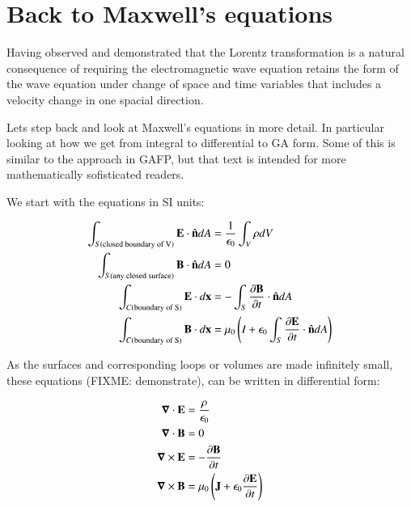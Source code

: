 \documentclass{article}      %
\title{} %
\author{Peeter Joot}         %
\date{ July 12, 2008. Revised $Date: 2008/09/05 00:44:36 $}
\newcommand{\spacegrad}[0]{\boldsymbol{\nabla}}
\begin{document}


\maketitle{}

\section{ Back to Maxwell's equations }

Having observed and demonstrated that the Lorentz transformation is a natural consequence of requiring the electromagnetic wave equation retains the
form of the wave equation under change of space and time variables that includes a velocity change in one spacial direction.

Lets step back and look at Maxwell's equations in more detail.  In particular looking at how we get from integral to differential
to GA form.  Some of this is similar to the approach in GAFP, but that text is intended for more mathematically sofisticated readers.

We start with the equations in SI units:

\begin{align*}
\int_{S(\text{closed boundary of V})} \mathbf{E} \cdot \hat{\mathbf{n}} dA &= \frac{1}{\epsilon_0} \int_V \rho dV \\
\int_{S(\text{any closed surface})} \mathbf{B} \cdot \hat{\mathbf{n}} dA &= 0 \\
\int_{C(\text{boundary of S})} \mathbf{E} \cdot d\mathbf{x} &= - \int_{S} \frac{\partial \mathbf{B}}{\partial t} \cdot \hat{\mathbf{n}} dA \\
\int_{C(\text{boundary of S})} \mathbf{B} \cdot d\mathbf{x} &= \mu_0\left(I + \epsilon_0\int_{S} \frac{\partial \mathbf{E}}{\partial t} \cdot \hat{\mathbf{n}} dA\right) \\
\end{align*}

As the surfaces and corresponding loops or volumes are made infinitely small, these equations (FIXME: demonstrate), can be written in differential form:

\begin{align*}
\spacegrad \cdot \BE &= \frac{\rho}{\epsilon_0} \\
\spacegrad \cdot \BB &= 0 \\
\spacegrad \cross \BE &= - \frac{\partial \BB}{\partial t} \\
\spacegrad \cross \BB &= \mu_0\left(\BJ + \epsilon_0 \frac{\partial \BE}{\partial t}\right) \\
\end{align*}
\end{document}
